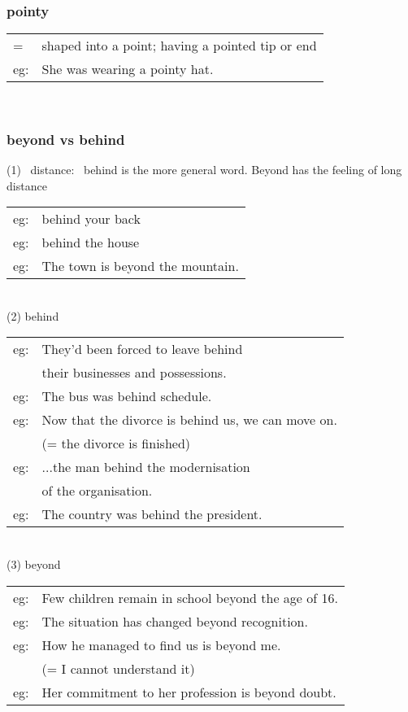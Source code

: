 \documentclass[14pt, t]{beamer}
\begin{document}
\begin{frame}
\frametitle{pointy}
\begin{tabular}{ll}
= & shaped into a point; having a pointed tip or end\\[8pt]
eg: & She was wearing a pointy hat. \\
\end{tabular} \\
\end{frame}
\begin{frame}[allowframebreaks]
\frametitle{beyond vs behind} 
(1) \, distance: \, behind is the more general word. 
Beyond has the feeling of long distance \\
\begin{tabular}{ll}
eg: & behind your back \\[2pt]
eg: & behind the house \\[2pt]
eg: & The town is beyond the mountain. \\
\end{tabular} \\
\framebreak
(2) behind \\[1pt]
\begin{tabular}{ll}
eg: & They'd been forced to leave behind \\
& their businesses and possessions. \\[2pt]
eg: & The bus was behind schedule. \\[2pt]
eg: &  Now that the divorce is behind us, we can move on. \\
& (= the divorce is finished) \\[2pt]
eg: & ...the man behind the modernisation\\
& of the organisation. \\[2pt]
eg: & The country was behind the president. \\
\end{tabular} \\
\framebreak
(3) beyond \\[1pt]
\begin{tabular}{ll}
eg: & Few children remain in school beyond the age of 16. \\[2pt]
eg: & The situation has changed beyond recognition. \\[2pt]
eg: & How he managed to find us is beyond me. \\
& (= I cannot understand it) \\[2pt]
eg: & Her commitment to her profession is beyond doubt. \\

\end{tabular}
\end{frame}
\end{document}
